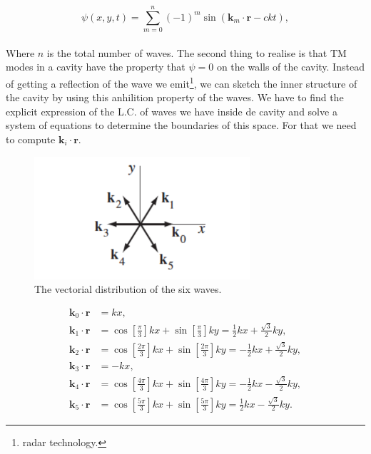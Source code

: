 \begin{equation}
	\psi(x, y, t)=\sum_{m=0}^{n}(-1)^{m} \sin \left(\mathbf{k}_{m} \cdot \mathbf{r}-c k t\right),
\end{equation}\\
Where $n$ is the total number of waves. The second thing to realise is that $\mathrm{TM}$ modes in a cavity have the property that $\psi=0$ on the walls of the cavity. Instead of getting a reflection of the wave we emit\footnote{radar technology.}, we can sketch the inner structure of the cavity by using this anhilition property of the waves. We have to find the explicit expression of the L.C. of waves we have inside de cavity and solve a system of equations to determine the boundaries of this space. For that we need to compute $\mathbf{k}_{i}\cdot\mathbf{r}$.


\begin{figure}[h]
	\includegraphics[width=8cm]{figures/6waves.png}
	\centering
	\caption{The vectorial distribution of the six waves.}
\end{figure}

\begin{equation}
	\begin{split}
		\mathbf{k}_{0} \cdot \mathbf{r}&=k x, \\
		\mathbf{k}_{1} \cdot \mathbf{r}&=\cos \left[\frac{\pi}{3}\right] k x+\sin \left[\frac{\pi}{3}\right] k y=\frac{1}{2} k x+\frac{\sqrt{3}}{2} k y,\\
		\mathbf{k}_{2} \cdot \mathbf{r}&=\cos \left[\frac{2 \pi}{3}\right] k x+\sin \left[\frac{2 \pi}{3}\right] k y=-\frac{1}{2} k x+\frac{\sqrt{3}}{2} k y,\\
		\mathbf{k}_{3} \cdot \mathbf{r}&=-k x, \\
		\mathbf{k}_{4} \cdot \mathbf{r}&=\cos \left[\frac{4\pi}{3}\right] k x+\sin \left[\frac{4\pi}{3}\right] k y=-\frac{1}{2} k x-\frac{\sqrt{3}}{2} k y,\\
		\mathbf{k}_{5} \cdot \mathbf{r}&=\cos \left[\frac{5 \pi}{3}\right] k x+\sin \left[\frac{5 \pi}{3}\right] k y=\frac{1}{2} k x-\frac{\sqrt{3}}{2} k y.
	\end{split}
\end{equation}


